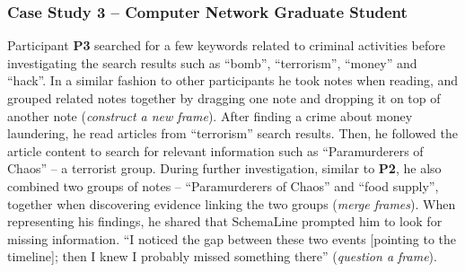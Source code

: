 \subsubsection{Case Study 3 -- Computer Network Graduate Student}
Participant \textbf{P3} searched for a few keywords related to criminal activities before investigating the search results such as ``bomb'', ``terrorism'', ``money'' and ``hack''. In a similar fashion to other participants he took notes when reading, and grouped related notes together by dragging one note and dropping it on top of another note (\textit{construct a new frame}). After finding a crime about money laundering, he read articles from ``terrorism'' search results. Then, he followed the article content to search for relevant information such as ``Paramurderers of Chaos'' -- a terrorist group. During further investigation, similar to \textbf{P2}, he also combined two groups of notes -- ``Paramurderers of Chaos'' and ``food supply'', together when discovering evidence linking the two groups (\textit{merge frames}). When representing his findings, he shared that SchemaLine prompted him to look for missing information. ``I noticed the gap between these two events [pointing to the timeline]; then I knew I probably missed something there'' (\textit{question a frame}).


